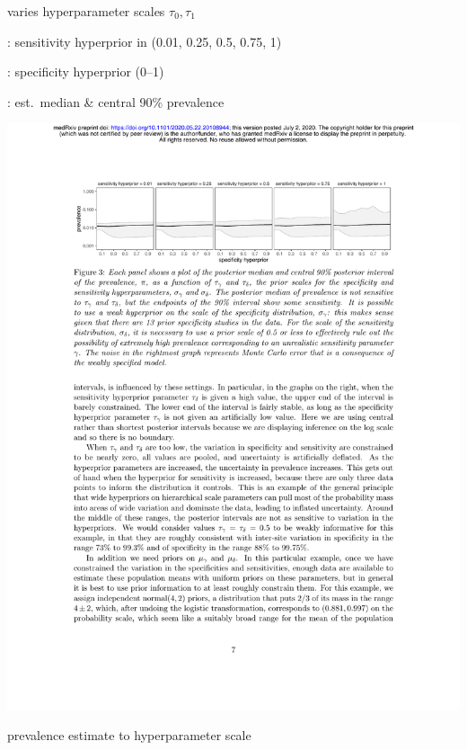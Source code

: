 \documentclass[9pt]{report}
\begin{document}
\begin{subitemize}
  \item {} varies hyperparameter scales $\tau_0,
    \tau_1$
    \vspace*{-6pt}
  \item {}:  sensitivity hyperprior in (0.01, 0.25, 0.5, 0.75, 1)
    \vspace*{-6pt}
  \item {}: specificity hyperprior (0--1)
    \vspace*{-6pt}
  \item {}:  est.\ median \& central 90\% prevalence
  \end{subitemize}
\quad\includegraphics[width=1.05\textwidth]{img/sensitivity-analysis.pdf}    
\begin{subitemize}
  \item prevalence estimate  to hyperparameter scale
  \end{subitemize}
\end{document}

